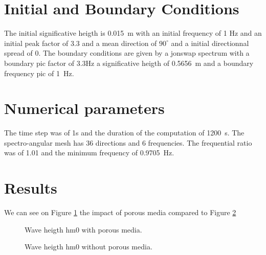 \section{Initial and Boundary Conditions}
%
The initial  significative heigth is 0.015~m with an initial frequency of 1
Hz and an initial peak factor of 3.3 and a mean direction of $90^{\circ}$ and a
initial directionnal spread of 0.
The boundary conditions are given by a jonswap spectrum with a boundary pic
factor of 3.3Hz a significative heigth of 0.5656~m and a boundary frequency pic
of 1~Hz.

%
%
\section{Numerical parameters}
%
The time step was of 1s and the duration of the computation of 1200~s. The
spectro-angular mesh has 36 directions and 6 frequencies. The frequential
ratio was of 1.01 and the minimum frequency of 0.9705~Hz.

\section{Results}
We can see on Figure \ref{resPorous} the impact of porous media compared to
Figure \ref{ressans}
\begin{figure} [!h]
\centering
{}
 \caption{Wave heigth hm0 with porous media.}
\label{resPorous}
\end{figure}
\begin{figure} [!h]
\centering
{}
 \caption{Wave heigth hm0 without porous media.}
\label{ressans}
\end{figure}
